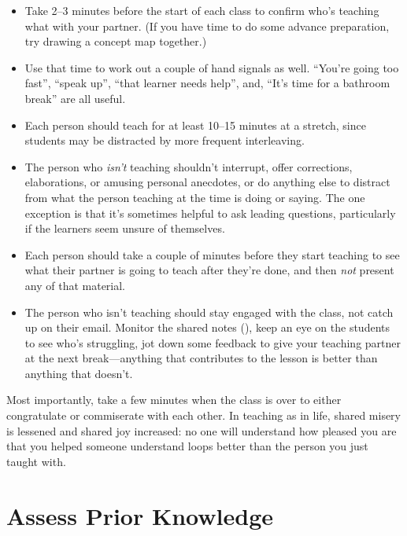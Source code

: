 \begin{itemize}

\item
  Take 2--3 minutes before the start of each class to confirm who's
  teaching what with your partner.  (If you have time to do some
  advance preparation, try drawing a concept map together.)

\item
  Use that time to work out a couple of hand signals as well.
  ``You're going too fast'', ``speak up'', ``that learner needs
  help'', and, ``It's time for a bathroom break'' are all useful.

\item
  Each person should teach for at least 10--15 minutes at a stretch,
  since students may be distracted by more frequent interleaving.

\item
  The person who \emph{isn't} teaching shouldn't interrupt, offer
  corrections, elaborations, or amusing personal anecdotes, or do
  anything else to distract from what the person teaching at the time
  is doing or saying.  The one exception is that it's sometimes
  helpful to ask leading questions, particularly if the learners seem
  unsure of themselves.

\item
  Each person should take a couple of minutes before they start
  teaching to see what their partner is going to teach after they're
  done, and then \emph{not} present any of that material.

\item
  The person who isn't teaching should stay engaged with the class,
  not catch up on their email.  Monitor the shared notes
  (), keep an eye on the students to
  see who's struggling, jot down some feedback to give your teaching
  partner at the next break---anything that contributes to the lesson
  is better than anything that doesn't.

\end{itemize}

Most importantly, take a few minutes when the class is over to either
congratulate or commiserate with each other.  In teaching as in life,
shared misery is lessened and shared joy increased: no one will
understand how pleased you are that you helped someone understand
loops better than the person you just taught with.

\section{Assess Prior Knowledge}\label{s:classroom-prior}

